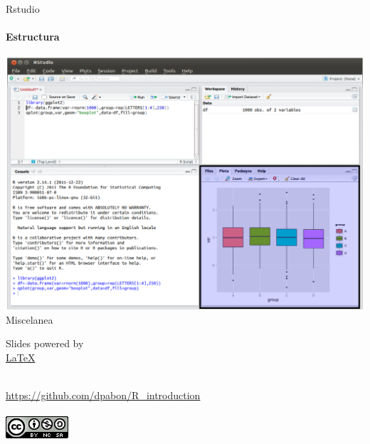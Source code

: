 \documentclass[12pt]{beamer}
\begin{document}
\begin{frame}{Rstudio}
\framesubtitle{Estructura}
\begin{center}
\includegraphics[scale=0.32]{images/rstudio4}\\
\footnotesize{Miscelanea}
\end{center}
\end{frame}


\begin{frame}
\begin{center}
\begin{LARGE}
Slides powered by\\
\href{https://latex-project.org/intro.html}{\LaTeX}\\
\end{LARGE}\\
\href{https://github.com/dpabon/R_introduction}{https://github.com/dpabon/R_introduction}\\
\\
\includegraphics[scale=0.5]{images/cc}
\end{center}
\end{frame}
\end{document}
